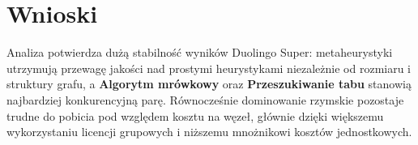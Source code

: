 \section{Wnioski}

Analiza potwierdza dużą stabilność wyników Duolingo Super: metaheurystyki utrzymują przewagę jakości nad prostymi heurystykami niezależnie od rozmiaru i struktury grafu, a \textbf{Algorytm mrówkowy} oraz \textbf{Przeszukiwanie tabu} stanowią najbardziej konkurencyjną parę. Równocześnie dominowanie rzymskie pozostaje trudne do pobicia pod względem kosztu na węzeł, głównie dzięki większemu wykorzystaniu licencji grupowych i niższemu mnożnikowi kosztów jednostkowych.
